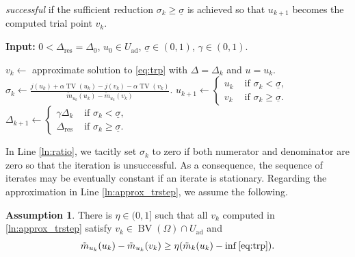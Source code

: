 \documentclass[11pt]{article}
\DeclareMathOperator*{\BV}{BV}
\DeclareMathOperator*{\TV}{TV}
\newcommand{\feas}{U_{\textrm{ad}}}
\theoremstyle{definition}
\newtheorem{assumption}[theorem]{Assumption}
\theoremstyle{remark}
\begin{document}
\emph{successful} if the sufficient reduction $\sigma_k \ge \underline{\sigma}$ is achieved
so that $u_{k+1}$ becomes the computed trial point $v_k$.
%
\begin{algorithm}[H]
\caption{Trust-region Algorithm}\label{alg:trm}
\textbf{Input:} $0 < \Delta_{\textrm{res}} = \Delta_0$, $u_0 \in \feas$,
$\underline{\sigma} \in (0,1)$, $\gamma \in (0,1)$.
\begin{algorithmic}[1]
	\State $v_k \gets $ approximate solution to \eqref{eq:trp} with $\Delta = \Delta_k$ and $u = u_k$.\label{ln:approx_trstep}
	\State $\displaystyle{\sigma_k \gets \frac{j(u_k) + \alpha \TV(u_k) - j(v_k) - \alpha \TV(v_k)}{\tilde{m}_{u_k}(u_k) - \tilde{m}_{u_k}(v_k)}.}$\label{ln:ratio}
	\State $u_{k+1} \gets 
	\begin{cases}
	u_k & \text{ if }\sigma_k < \underline{\sigma}, \\
	v_k & \text{ if }\sigma_k \ge \underline{\sigma}.
	\end{cases}$\label{ln:acceptance}
	\State  $\Delta_{k+1} \gets
	\begin{cases}
	\gamma\Delta_k & \text{ if }\sigma_k < \underline{\sigma}, \\
	\Delta_{\textrm{res}}  & \text{ if }\sigma_k \ge \underline{\sigma}.
	\end{cases}$\label{ln:tr_update}
	\EndFor
\end{algorithmic}
\end{algorithm}
%
In Line \ref{ln:ratio}, we tacitly set $\sigma_k$ to zero if both numerator and
denominator are zero so that the iteration is unsuccessful. As a consequence,
the sequence of iterates may be eventually constant
if an iterate is stationary.
Regarding the approximation in Line \ref{ln:approx_trstep},
we assume the following.
%
\begin{assumption}\label{ass:approx_step}
There is $\eta \in (0,1]$ such that all $v_k$ computed in \cref{ln:approx_trstep} satisfy
$v_k \in \BV(\Omega) \cap \feas$ and
%
\begin{gather}\label{eq:pred_ratio_assumption}
\tilde{m}_{u_k}(u_k) - \tilde{m}_{u_k}(v_k) \ge \eta (\tilde{m}_k(u_k) - \inf \eqref{eq:trp}).
\end{gather}
\end{assumption}
\end{document}

